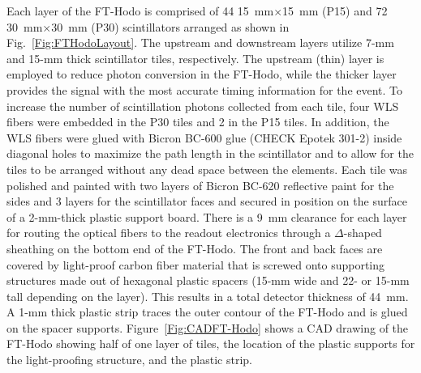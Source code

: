 Each layer of the FT-Hodo is comprised of 44 15~mm$\times$15~mm (P15) and 72 30~mm$\times$30~mm (P30)
scintillators arranged as shown in Fig.~\ref{Fig:FTHodoLayout}. The upstream and downstream layers utilize 7-mm
and 15-mm thick scintillator tiles, respectively. The upstream (thin) layer is employed to reduce photon conversion in
the FT-Hodo, while the thicker layer provides the signal with the most accurate timing information for the event. To
increase the number of scintillation photons collected from each tile, four WLS fibers were embedded in the P30
tiles and 2 in the P15 tiles. In addition, the WLS fibers were glued with Bicron BC-600 glue (CHECK Epotek 301-2)
inside diagonal holes to maximize the path length in the scintillator and to allow for the tiles to be arranged without
any dead space between the elements. Each tile was polished and painted with two layers of Bicron BC-620 reflective
paint for the sides and 3 layers for the scintillator faces and secured in position on the surface of a 2-mm-thick
plastic support board. There is a 9~mm clearance for each layer for routing the optical fibers to the readout
electronics through a $\Delta$-shaped sheathing on the bottom end of the FT-Hodo. The front and back faces are
covered by light-proof carbon fiber material that is screwed onto supporting structures made out of hexagonal
plastic spacers (15-mm wide and 22- or 15-mm tall depending on the layer). This results in a total detector thickness
of 44~mm. A 1-mm thick plastic strip traces the outer contour of the FT-Hodo and is glued on the spacer supports.
Figure~\ref{Fig:CADFT-Hodo} shows a CAD drawing of the FT-Hodo showing half of one layer of tiles, the location
of the plastic supports for the light-proofing structure, and the plastic strip.  

